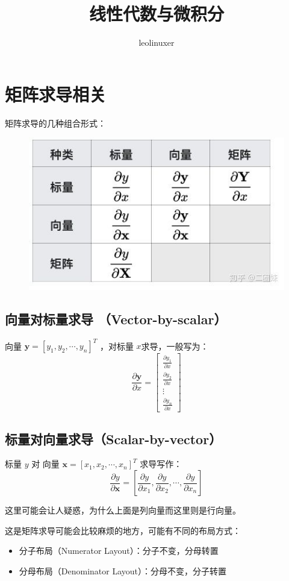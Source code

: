 \documentclass[12pt]{article}
\title{线性代数与微积分}
\author{leolinuxer}
\begin{document}
\maketitle

\section{矩阵求导相关\cite{Brief_Introduction_Of_Derivative_Of_Matrix}}
矩阵求导的几种组合形式：
\begin{figure}[H]
\centering
\includegraphics[width=.5\textwidth]{fig/DerivativeOfMatrix_1.jpg}
\end{figure}

\subsection{向量对标量求导 （Vector-by-scalar）}
向量 $\mathbf{y} = [y_1, y_2, \cdots, y_n]^T$ ，对标量 $x$求导，一般写为：
$$
\frac{\partial \mathbf{y}}{\partial x} = \begin{bmatrix}
\frac{\partial y_1}{\partial x} \\
\frac{\partial y_2}{\partial x} \\
\vdots \\
\frac{\partial y_n}{\partial x}
\end{bmatrix}
$$

\subsection{标量对向量求导（Scalar-by-vector）}
标量 $y$ 对 向量 $\mathbf{x} = [x_1, x_2, \cdots, x_n]^T$ 求导写作：
$$
\frac{\partial y}{\partial \mathbf{x}} = [\frac{\partial y}{\partial x_1}, 
\frac{\partial y}{\partial x_2},
\cdots,
\frac{\partial y}{\partial x_n}
]
$$

这里可能会让人疑惑，为什么上面是列向量而这里则是行向量。

这是矩阵求导可能会比较麻烦的地方，可能有不同的布局方式：
\begin{itemize}
    \item 分子布局（Numerator Layout）：分子不变，分母转置
    \item 分母布局（Denominator Layout）：分母不变，分子转置
\end{itemize}
\end{document}
